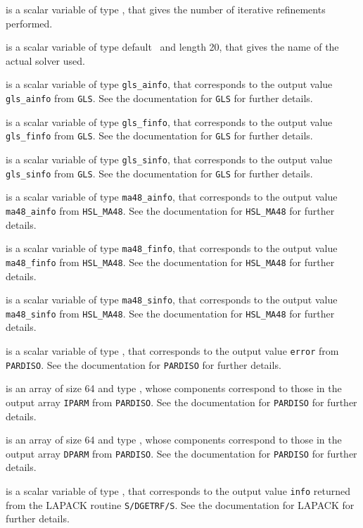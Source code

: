\documentclass{galahad}
\begin{document}
\begin{description}
 is a scalar variable of type \integer,
that gives the number of iterative refinements performed.

 is a scalar variable of type default \character\
and length 20, that  gives the name of the actual solver used.

 is a scalar variable of type {\tt gls\_ainfo},
that corresponds to the output value {\tt gls\_ainfo}
from {\tt GLS}. See the documentation for {\tt GLS} for further
details.

 is a scalar variable of type {\tt gls\_finfo},
that corresponds to the output value {\tt gls\_finfo}
from {\tt GLS}. See the documentation for {\tt GLS} for further
details.

 is a scalar variable of type {\tt gls\_sinfo},
that corresponds to the output value {\tt gls\_sinfo}
from {\tt GLS}. See the documentation for {\tt GLS} for further
details.

 is a scalar variable of type {\tt ma48\_ainfo},
that corresponds to the output value {\tt ma48\_ainfo}
from {\tt HSL\_MA48}. See the documentation for {\tt HSL\_MA48} for further
details.

 is a scalar variable of type {\tt ma48\_finfo},
that corresponds to the output value {\tt ma48\_finfo}
from {\tt HSL\_MA48}. See the documentation for {\tt HSL\_MA48} for further
details.

 is a scalar variable of type {\tt ma48\_sinfo},
that corresponds to the output value {\tt ma48\_sinfo}
from {\tt HSL\_MA48}. See the documentation for {\tt HSL\_MA48} for further
details.

 is a scalar variable of type \integer,
that corresponds to the output value {\tt error}
from {\tt PARDISO}. See the documentation for {\tt PARDISO} for further
details.

 is an array of size 64 and type \integer,
whose components correspond to those in the output array {\tt IPARM}
from {\tt PARDISO}. See the documentation for {\tt PARDISO} for further
details.

 is an array of size 64 and type \realdp,
whose components correspond to those in the output array {\tt DPARM}
from {\tt PARDISO}. See the documentation for {\tt PARDISO} for further
details.

 is a scalar variable of type \integer,
that corresponds to the output value {\tt info} returned from
the LAPACK routine {\tt S/DGETRF/S}.
See the documentation for LAPACK for further details.

\end{description}
\end{document}
